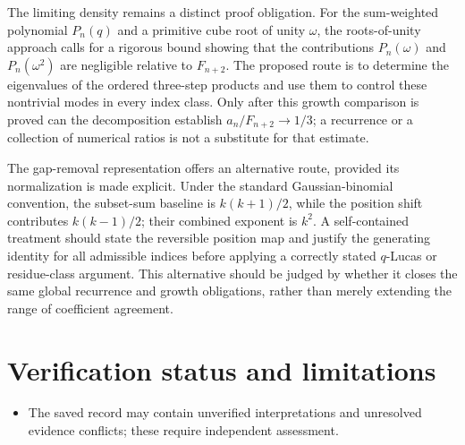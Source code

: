 \documentclass[11pt]{article}
\begin{document}
The limiting density remains a distinct proof obligation. For the sum-weighted polynomial $P_n(q)$ and a primitive cube root of unity $\omega$, the roots-of-unity approach calls for a rigorous bound showing that the contributions $P_n(\omega)$ and $P_n(\omega^2)$ are negligible relative to $F_{n+2}$. The proposed route is to determine the eigenvalues of the ordered three-step products and use them to control these nontrivial modes in every index class. Only after this growth comparison is proved can the decomposition establish $a_n/F_{n+2}\to 1/3$; a recurrence or a collection of numerical ratios is not a substitute for that estimate.

The gap-removal representation offers an alternative route, provided its normalization is made explicit. Under the standard Gaussian-binomial convention, the subset-sum baseline is $k(k+1)/2$, while the position shift contributes $k(k-1)/2$; their combined exponent is $k^2$. A self-contained treatment should state the reversible position map and justify the generating identity for all admissible indices before applying a correctly stated $q$-Lucas or residue-class argument. This alternative should be judged by whether it closes the same global recurrence and growth obligations, rather than merely extending the range of coefficient agreement.

\section{Verification status and limitations}
\begin{itemize}
\item The saved record may contain unverified interpretations and unresolved evidence conflicts; these require independent assessment.
\end{itemize}
\end{document}

